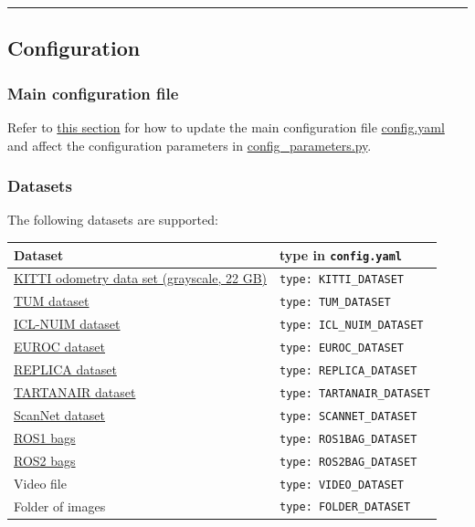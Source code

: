 \documentclass{article}
\begin{document}
\begin{center}\rule{0.5\linewidth}{0.5pt}\end{center}

\hypertarget{configuration}{%
\subsection{Configuration}\label{configuration}}

\hypertarget{main-configuration-file}{%
\subsubsection{Main configuration file}\label{main-configuration-file}}

Refer to
\protect\hyperlink{selecting-a-dataset-and-different-configuration-parameters}{this
section} for how to update the main configuration file
\href{./config.yaml}{config.yaml} and affect the configuration
parameters in \href{./config_parameters.py}{config\_parameters.py}.

\hypertarget{datasets}{%
\subsubsection{Datasets}\label{datasets}}

The following datasets are supported:

\begin{longtable}[]{@{}ll@{}}
\toprule
Dataset & type in \texttt{config.yaml}\tabularnewline
\midrule
\endhead
\href{http://www.cvlibs.net/datasets/kitti/eval_odometry.php}{KITTI
odometry data set (grayscale, 22 GB)} &
\texttt{type:\ KITTI\_DATASET}\tabularnewline
\href{https://vision.in.tum.de/data/datasets/rgbd-dataset/download}{TUM
dataset} & \texttt{type:\ TUM\_DATASET}\tabularnewline
\href{https://www.doc.ic.ac.uk/~ahanda/VaFRIC/iclnuim.html}{ICL-NUIM
dataset} & \texttt{type:\ ICL\_NUIM\_DATASET}\tabularnewline
\href{http://projects.asl.ethz.ch/datasets/doku.php?id=kmavvisualinertialdatasets}{EUROC
dataset} & \texttt{type:\ EUROC\_DATASET}\tabularnewline
\href{https://github.com/facebookresearch/Replica-Dataset}{REPLICA
dataset} & \texttt{type:\ REPLICA\_DATASET}\tabularnewline
\href{https://theairlab.org/tartanair-dataset/}{TARTANAIR dataset} &
\texttt{type:\ TARTANAIR\_DATASET}\tabularnewline
\href{http://www.scan-net.org/}{ScanNet dataset} &
\texttt{type:\ SCANNET\_DATASET}\tabularnewline
\href{https://wiki.ros.org/Bags}{ROS1 bags} &
\texttt{type:\ ROS1BAG\_DATASET}\tabularnewline
\href{https://docs.ros.org/en/foxy/Tutorials/Beginner-CLI-Tools/Recording-And-Playing-Back-Data/Recording-And-Playing-Back-Data.html}{ROS2
bags} & \texttt{type:\ ROS2BAG\_DATASET}\tabularnewline
Video file & \texttt{type:\ VIDEO\_DATASET}\tabularnewline
Folder of images & \texttt{type:\ FOLDER\_DATASET}\tabularnewline
\bottomrule
\end{longtable}
\end{document}
